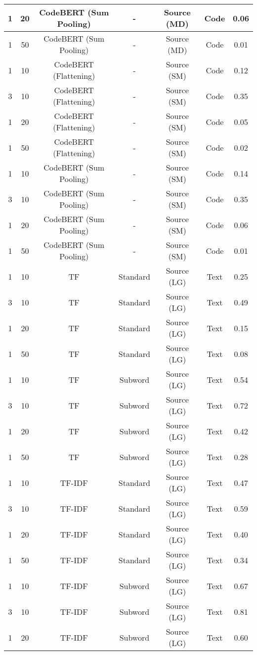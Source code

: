 \begin{longtable}{|c|c|c|c|c|c|c|}
\hline
1 & 20 & CodeBERT (Sum Pooling) & - & Source (MD) & Code & 0.06 \\
\hline
1 & 50 & CodeBERT (Sum Pooling) & - & Source (MD) & Code & 0.01 \\
\hline
1 & 10 & CodeBERT (Flattening) & - & Source (SM) & Code & 0.12 \\
\hline
3 & 10 & CodeBERT (Flattening) & - & Source (SM) & Code & 0.35 \\
\hline
1 & 20 & CodeBERT (Flattening) & - & Source (SM) & Code & 0.05 \\
\hline
1 & 50 & CodeBERT (Flattening) & - & Source (SM) & Code & 0.02 \\
\hline
1 & 10 & CodeBERT (Sum Pooling) & - & Source (SM) & Code & 0.14 \\
\hline
3 & 10 & CodeBERT (Sum Pooling) & - & Source (SM) & Code & 0.35 \\
\hline
1 & 20 & CodeBERT (Sum Pooling) & - & Source (SM) & Code & 0.06 \\
\hline
1 & 50 & CodeBERT (Sum Pooling) & - & Source (SM) & Code & 0.01 \\
\hline
1 & 10 & TF & Standard & Source (LG) & Text & 0.25 \\
\hline
3 & 10 & TF & Standard & Source (LG) & Text & 0.49 \\
\hline
1 & 20 & TF & Standard & Source (LG) & Text & 0.15 \\
\hline
1 & 50 & TF & Standard & Source (LG) & Text & 0.08 \\
\hline
1 & 10 & TF & Subword & Source (LG) & Text & 0.54 \\
\hline
3 & 10 & TF & Subword & Source (LG) & Text & 0.72 \\
\hline
1 & 20 & TF & Subword & Source (LG) & Text & 0.42 \\
\hline
1 & 50 & TF & Subword & Source (LG) & Text & 0.28 \\
\hline
1 & 10 & TF-IDF & Standard & Source (LG) & Text & 0.47 \\
\hline
3 & 10 & TF-IDF & Standard & Source (LG) & Text & 0.59 \\
\hline
1 & 20 & TF-IDF & Standard & Source (LG) & Text & 0.40 \\
\hline
1 & 50 & TF-IDF & Standard & Source (LG) & Text & 0.34 \\
\hline
1 & 10 & TF-IDF & Subword & Source (LG) & Text & 0.67 \\
\hline
3 & 10 & TF-IDF & Subword & Source (LG) & Text & 0.81 \\
\hline
1 & 20 & TF-IDF & Subword & Source (LG) & Text & 0.60 \\

\end{longtable}
